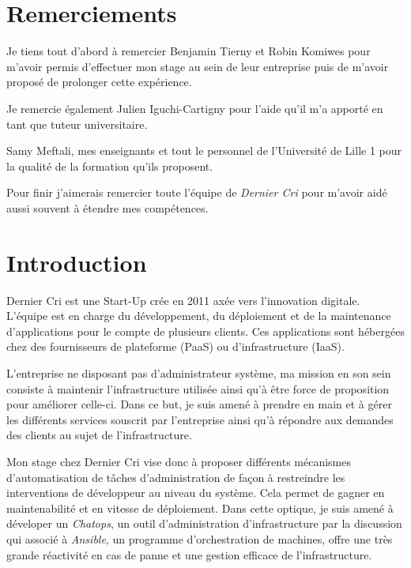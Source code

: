 \newpage

\section{Remerciements}\label{remerciements}

\bigskip

Je tiens tout d'abord à remercier Benjamin Tierny et Robin Komiwes pour
m'avoir permis d'effectuer mon stage au sein de leur entreprise puis de
m'avoir proposé de prolonger cette expérience.

\bigskip

Je remercie également Julien Iguchi-Cartigny pour l'aide qu'il m'a
apporté en tant que tuteur universitaire.

\bigskip

Samy Meftali, mes enseignants et tout le personnel de l'Université de
Lille 1 pour la qualité de la formation qu'ils proposent.

\bigskip

Pour finir j'aimerais remercier toute l'équipe de \emph{Dernier Cri}
pour m'avoir aidé aussi souvent à étendre mes compétences.

\newpage

\section{Introduction}\label{introduction}

\bigskip

Dernier Cri est une Start-Up crée en 2011 axée vers l'innovation
digitale. L'équipe est en charge du développement, du déploiement et de
la maintenance d'applications pour le compte de plusieurs clients. Ces
applications sont hébergées chez des fournisseurs de plateforme (PaaS)
ou d'infrastructure (IaaS).

\bigskip

L'entreprise ne disposant pas d'administrateur système, ma mission en
son sein consiste à maintenir l'infrastructure utilisée ainsi qu'à être
force de proposition pour améliorer celle-ci. Dans ce but, je suis amené
à prendre en main et à gérer les différents services souscrit par
l'entreprise ainsi qu'à répondre aux demandes des clients au sujet de
l'infrastructure.

\bigskip

Mon stage chez Dernier Cri vise donc à proposer différents mécanismes
d'automatisation de tâches d'administration de façon à restreindre les
interventions de développeur au niveau du système. Cela permet de gagner
en maintenabilité et en vitesse de déploiement. Dans cette optique, je
suis amené à déveloper un \emph{Chatops}, un outil d'administration
d'infrastructure par la discussion qui associé à \emph{Ansible}, un
programme d'orchestration de machines, offre une très grande réactivité
en cas de panne et une gestion efficace de l'infrastructure.

